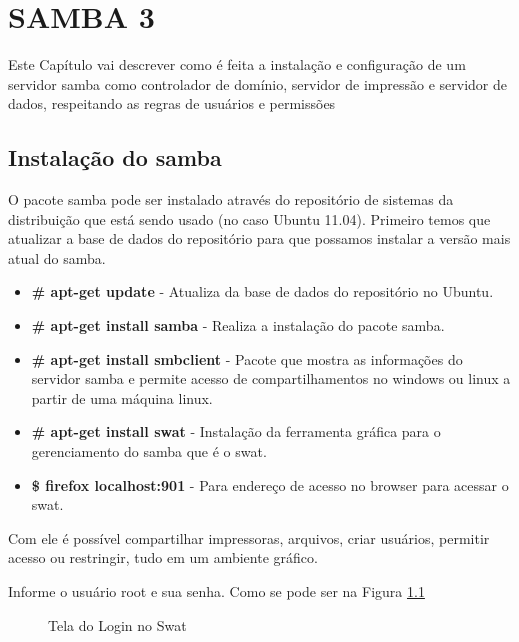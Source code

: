\chapter{SAMBA 3}
Este Capítulo vai descrever como é feita a instalação e configuração de um servidor samba como controlador de domínio, servidor de impressão e servidor de dados, respeitando as regras de usuários e permissões

\section{Instalação do samba}

O pacote samba pode ser instalado através do repositório de sistemas da distribuição que está sendo usado (no caso Ubuntu 11.04). Primeiro temos que atualizar a base de dados do repositório para que possamos instalar a versão mais atual do samba.

\begin{itemize}
    \item \textbf{\# apt-get update} - Atualiza da base de dados do repositório no Ubuntu.
    \item \textbf{\# apt-get install samba} - Realiza a instalação do pacote samba.
    \item \textbf{\# apt-get install smbclient} - Pacote que mostra as informações do servidor samba e permite acesso de compartilhamentos no windows ou linux a partir de uma máquina linux.
    \item \textbf{\# apt-get install swat} - Instalação da ferramenta gráfica para o gerenciamento do samba que é o swat.
    \item \textbf{\$ firefox localhost:901} - Para endereço de acesso no browser para acessar o swat.
\end{itemize}

Com ele é possível compartilhar impressoras, arquivos, criar usuários, permitir acesso ou restringir, tudo em um ambiente gráfico.

Informe o usuário root e sua senha. Como se pode ser na Figura \ref{swat_login}

\begin{figure}[hp]
   	\centering
   	\caption{Tela do Login no Swat}
    \label{swat_login}
\end{figure}

